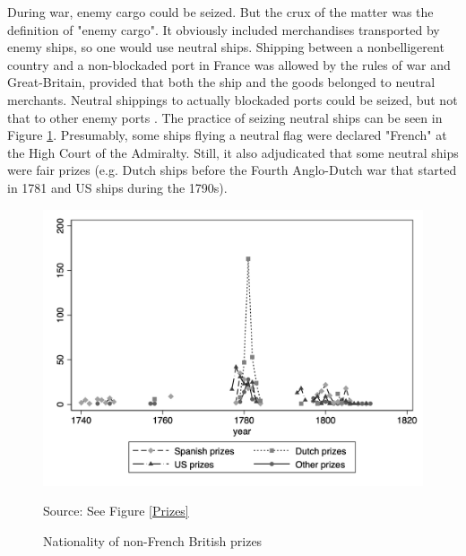 \documentclass[12pt,a4paper,notitlepage,english]{article}
\newcommand{\source}[1]{\caption*{\footnotesize Source: {#1}} }
\begin{document}
During war, enemy cargo could be seized. But the crux of the matter was the definition of "enemy cargo". It obviously included merchandises transported by enemy ships, so one would use neutral ships.
Shipping between a nonbelligerent country and a non-blockaded port in France was allowed by the rules of war and Great-Britain, provided that both the ship and the goods belonged to neutral merchants.
Neutral shippings to actually blockaded ports could be seized, but not that to other enemy ports \citep[p. 112]{Schnakenbourg2013}.
The practice of seizing neutral ships can be seen in Figure \ref{Prizes_nationality}.
Presumably, some ships flying a neutral flag were declared "French" at the High Court of the Admiralty.
Still, it also adjudicated that some neutral ships were fair prizes (e.g. Dutch ships before the Fourth Anglo-Dutch war that started in 1781 and US ships during the 1790s).

\begin{center}
	\begin{figure}[H]
		\caption{Nationality of non-French British prizes}
		\label{Prizes_nationality}
		\centering
		\includegraphics[scale=.51]{Prizes_nationality.png}
		\source{See Figure \ref{Prizes}}
	\end{figure}
\end{center}
\end{document}
